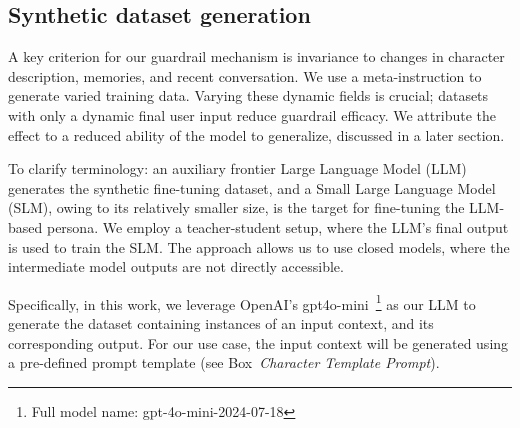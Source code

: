 \documentclass[letterpaper]{article}
\newcommand{\allm}{OpenAI's gpt4o-mini}
\newcommand{\fullallm}{gpt-4o-mini-2024-07-18} %
\begin{document}
\subsection{Synthetic dataset generation}
A key criterion for our guardrail mechanism is invariance to changes in character description, memories, and recent conversation. We use a meta-instruction to generate varied training data. Varying these dynamic fields is crucial; datasets with only a dynamic final user input reduce guardrail efficacy. We attribute the effect to a reduced ability of the model to generalize, discussed in a later section.

To clarify terminology: an auxiliary frontier Large Language Model (LLM) generates the synthetic fine-tuning dataset, and a Small Large Language Model (SLM), owing to its relatively smaller size, is the target for fine-tuning the LLM-based persona. We employ a teacher-student setup, where the LLM's final output is used to train the SLM.\@ 
The approach allows us to use closed models, where the intermediate model outputs are not directly accessible.

Specifically, in this work, we leverage \allm~\footnote{Full model name: \fullallm} as our LLM to generate the dataset containing instances of an input context, and its corresponding output. For our use case, the input context will be generated using a pre-defined prompt template (see Box~\textit{Character Template Prompt}).
\end{document}
